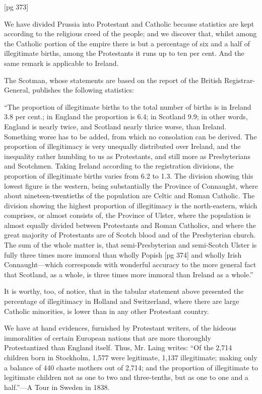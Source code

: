 [pg 373]

We have divided Prussia into Protestant and
Catholic because statistics are kept according to
the religious creed of the people; and we discover
that, whilst among the Catholic portion of the empire
there is but a percentage of six and a half of
illegitimate births, among the Protestants it runs
up to ten per cent. And the same remark is applicable
to Ireland.

The Scotman, whose statements are based on the
report of the British Registrar-General, publishes
the following statistics:

“The proportion of illegitimate births to the
total number of births is in Ireland 3.8 per cent.;
in England the proportion is 6.4; in Scotland 9.9;
in other words, England is nearly twice, and Scotland
nearly thrice worse, than Ireland. Something
worse has to be added, from which no consolation
can be derived. The proportion of illegitimacy
is very unequally distributed over Ireland,
and the inequality rather humbling to us as Protestants,
and still more as Presbyterians and
Scotchmen. Taking Ireland according to the
registration divisions, the proportion of illegitimate
births varies from 6.2 to 1.3. The division
showing this lowest figure is the western, being
substantially the Province of Connaught, where
about nineteen-twentieths of the population are
Celtic and Roman Catholic. The division showing
the highest proportion of illegitimacy is the north-eastern,
which comprises, or almost consists of,
the Province of Ulster, where the population is almost
equally divided between Protestants and Roman
Catholics, and where the great majority of
Protestants are of Scotch blood and of the Presbyterian
church. The sum of the whole matter is,
that semi-Presbyterian and semi-Scotch Ulster is
fully three times more immoral than wholly Popish
[pg 374]
and wholly Irish Connaught—which corresponds
with wonderful accuracy to the more general
fact that Scotland, as a whole, is three times
more immoral than Ireland as a whole.”

It is worthy, too, of notice, that in the tabular
statement above presented the percentage of illegitimacy
in Holland and Switzerland, where
there are large Catholic minorities, is lower than
in any other Protestant country.

We have at hand evidences, furnished by Protestant
writers, of the hideous immoralities of certain
European nations that are more thoroughly
Protestantized than England itself. Thus, Mr.
Laing writes: “Of the 2,714 children born in
Stockholm, 1,577 were legitimate, 1,137 illegitimate;
making only a balance of 440 chaste mothers
out of 2,714; and the proportion of illegitimate to
legitimate children not as one to two and three-tenths,
but as one to one and a half.”—A Tour in
Sweden in 1838.

